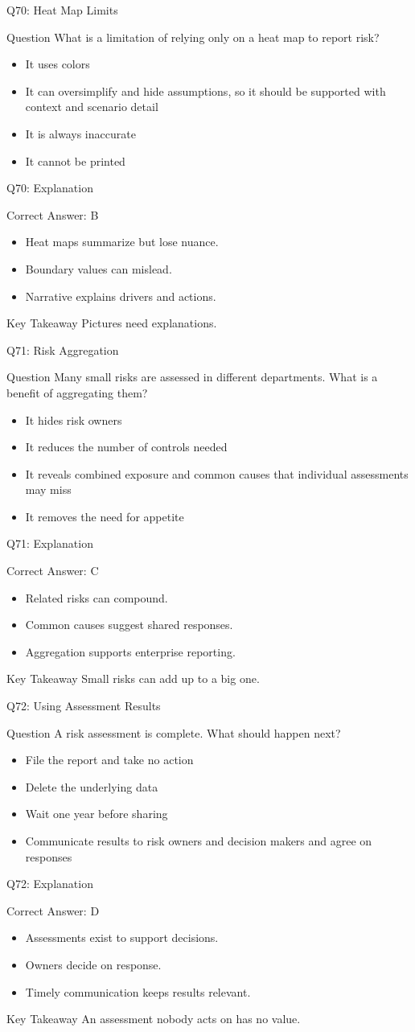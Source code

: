 \documentclass[aspectratio=169]{beamer}
\newcommand{\hq}[7]{%
	\begin{frame}{Q#1: #2}
		\begin{block}{Question}
			#3
		\end{block}
		\begin{itemize}
			#4
		\end{itemize}
	\end{frame}
	\begin{frame}{Q#1: Explanation}
		\begin{block}{Correct Answer: #5}
			\begin{itemize}
				#6
			\end{itemize}
		\end{block}
		\begin{alertblock}{Key Takeaway}
			#7
		\end{alertblock}
	\end{frame}
}
\begin{document}
	\hq{70}{Heat Map Limits}
	{What is a limitation of relying only on a heat map to report risk?}
	{\item[\textbf{(A)}] It uses colors
		\item[\textbf{(B)}] It can oversimplify and hide assumptions, so it should be supported with context and scenario detail
		\item[\textbf{(C)}] It is always inaccurate
		\item[\textbf{(D)}] It cannot be printed}
	{B}
	{\item Heat maps summarize but lose nuance.
		\item Boundary values can mislead.
		\item Narrative explains drivers and actions.}
	{Pictures need explanations.}
	
	\hq{71}{Risk Aggregation}
	{Many small risks are assessed in different departments. What is a benefit of aggregating them?}
	{\item[\textbf{(A)}] It hides risk owners
		\item[\textbf{(B)}] It reduces the number of controls needed
		\item[\textbf{(C)}] It reveals combined exposure and common causes that individual assessments may miss
		\item[\textbf{(D)}] It removes the need for appetite}
	{C}
	{\item Related risks can compound.
		\item Common causes suggest shared responses.
		\item Aggregation supports enterprise reporting.}
	{Small risks can add up to a big one.}
	
	\hq{72}{Using Assessment Results}
	{A risk assessment is complete. What should happen next?}
	{\item[\textbf{(A)}] File the report and take no action
		\item[\textbf{(B)}] Delete the underlying data
		\item[\textbf{(C)}] Wait one year before sharing
		\item[\textbf{(D)}] Communicate results to risk owners and decision makers and agree on responses}
	{D}
	{\item Assessments exist to support decisions.
		\item Owners decide on response.
		\item Timely communication keeps results relevant.}
	{An assessment nobody acts on has no value.}
	
\end{document}
